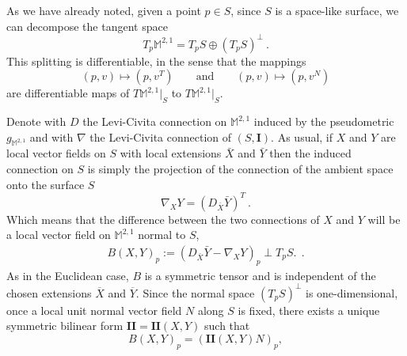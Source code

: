 \documentclass[a4paper,11pt,openright,twoside]{book}
\newcommand{\M}{\mathbb{M}^{2,1}}
\newcommand{\I}{\mathbf{I}}
\newcommand{\II}{\mathbf{I\!I}}
\newcommand{\1}{\mathds{1}}
\theoremstyle{plain}
\theoremstyle{definition}
\theoremstyle{remark}
\begin{document}
As we have already noted, given a point $p\in S$, since $S$ is a space-like surface, we can decompose the tangent space
\[T_p \M = T_p S \oplus (T_pS)^\perp\ . \] 
This splitting is differentiable, in the sense that the mappings
 \[(p,v) \mapsto (p,v^T) \qquad\text{and}\qquad (p,v)\mapsto (p,v^N)  \] 
 are differentiable maps of $T\M|_S$ to $T\M|_S$.

Denote with $D$ the Levi-Civita connection on $\M$ induced by the pseudometric $g_{\M}$ and with $\nabla$ the Levi-Civita connection of $(S,\I)$. As usual, if $X$ and $Y$ are local vector fields on $S$ with local extensions $\bar X$ and $\bar Y$ then the induced connection on  $S$ is simply the projection of the connection of the ambient space onto the surface $S$
\[ \nabla_X Y = \left( D_{\bar X} \bar Y \right)^T\ .\] 
Which means that the difference between the two connections of $X$ and $Y$ will be a local vector field on $\M$  normal to $S$,
\begin{align}\label{eq:defB}
	B(X,Y)_p := (D_{\bar X} \bar Y - \nabla_X Y)_p \perp T_pS.
\ \ . 
\end{align}
As in the Euclidean case, $B$ is a symmetric tensor and is independent of the chosen extensions $\overline X$ and $\overline Y$. Since the normal space $(T_pS)^\perp$ is one-dimensional, once a local unit normal vector field $N$ along $S$ is fixed, there exists a unique symmetric bilinear form $\II = \II(X,Y)$ such that
\[
B(X,Y)_p=(\II(X,Y)N)_p,
\]
\end{document}
